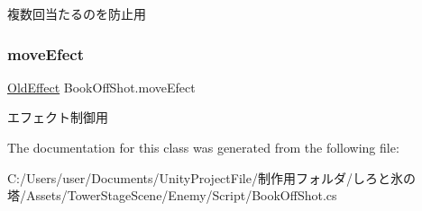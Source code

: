 複数回当たるのを防止用 

\mbox{\label{class_book_off_shot_a5c4c0131ce9a83508127527d612ca874}} 
\subsubsection{\texorpdfstring{move\+Efect}{moveEfect}}
{\footnotesize\ttfamily \hyperlink{class_old_effect}{Old\+Effect} Book\+Off\+Shot.\+move\+Efect\hspace{0.3cm}{\ttfamily [private]}}



エフェクト制御用 



The documentation for this class was generated from the following file\+:\begin{DoxyCompactItemize}
\item 
C\+:/\+Users/user/\+Documents/\+Unity\+Project\+File/制作用フォルダ/しろと氷の塔/\+Assets/\+Tower\+Stage\+Scene/\+Enemy/\+Script/Book\+Off\+Shot.\+cs\end{DoxyCompactItemize}
